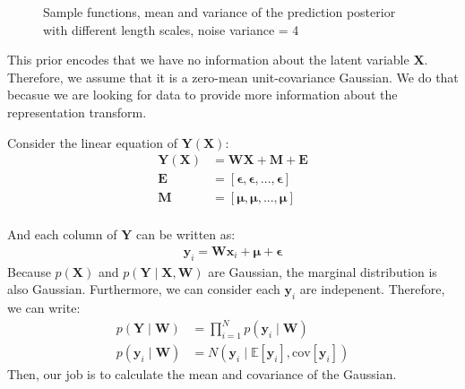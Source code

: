 \documentclass[12pt]{article}
\newenvironment{question}[2][Question]{\begin{trivlist}
\kern10pt
\item[\hskip \labelsep {\bfseries #1}\hskip \labelsep {\bfseries #2.}]}{\end{trivlist}}
\begin{document}
\begin{question}{11}
\begin{figure}[h!]
{  }
  \caption{Sample functions, mean and variance of the prediction posterior with 
           different length scales, noise variance = 4}
  \label{fig:Q11-predict-post-noise4}
\end{figure}


\end{question}

\begin{question}{12}
This prior encodes that we have no information about the latent variable $\mathbf{X}$.
Therefore, we assume that it is a zero-mean unit-covariance Gaussian. We do that becasue
we are looking for data to provide more information about the representation transform.
\end{question}

\begin{question}{13}
Consider the linear equation of $\mathbf{Y}(\mathbf{X})$:
\begin{align*}
  \mathbf{Y}(\mathbf{X}) &= \mathbf{W}\mathbf{X} + \mathbf{M} + \mathbf{E} \\
  \mathbf{E} &= [\bm{\epsilon}, \bm{\epsilon}, ..., \bm{\epsilon}] \\
  \mathbf{M} &= [\bm{\mu}, \bm{\mu}, ..., \bm{\mu}] \\  
\end{align*}

And each column of $\mathbf{Y}$ can be written as:
\begin{align*}
  \mathbf{y}_i = \mathbf{W}\mathbf{x}_i + \bm{\mu} +\bm{\epsilon}
\end{align*}
Because $p(\mathbf{X})$ and $p(\mathbf{Y}\mid\mathbf{X}, \mathbf{W})$ are Gaussian, 
 the marginal distribution is also Gaussian.
 Furthermore, we can consider each $\mathbf{y}_i$ are indepenent. Therefore, 
 we can write:
\begin{align*}
  p(\mathbf{Y}\mid\mathbf{W}) &= \prod_{i=1}^{N} p(\mathbf{y}_i\mid\mathbf{W}) \\
  p(\mathbf{y}_i\mid\mathbf{W}) &= N(\mathbf{y}_i\mid \mathbb{E}[\mathbf{y}_i], \text{cov}[\mathbf{y}_i])
\end{align*}
Then, our job is to calculate the mean and covariance of the Gaussian.


\end{question}
\end{document}
